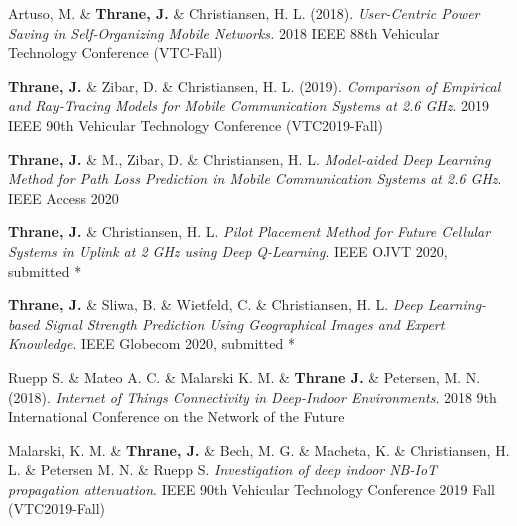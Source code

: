 \vspace{2em}


\noindent Artuso, M. \&  \textbf{Thrane, J.} \&  Christiansen, H. L. (2018). \textit{User-Centric Power Saving in Self-Organizing Mobile Networks.} 2018 IEEE 88th Vehicular Technology Conference (VTC-Fall) \cite{Artuso2018User-CentricNetworks}

\vspace{2em}

\noindent \textbf{Thrane, J.} \&  Zibar, D. \&  Christiansen, H. L. (2019). \textit{Comparison of Empirical and Ray-Tracing Models for Mobile Communication Systems at 2.6 GHz}. 2019 IEEE 90th Vehicular Technology Conference (VTC2019-Fall) \cite{Thrane2019ComparisonGHz}

\vspace{2em}

\noindent \textbf{Thrane, J.} \&  M., Zibar, D. \&  Christiansen, H. L. \textit{Model-aided Deep Learning Method for Path Loss Prediction in Mobile Communication Systems at 2.6 GHz}. IEEE Access 2020 \cite{Thrane020ModelAidedDeepLearning}

\vspace{2em}

\noindent \textbf{Thrane, J.} \&  Christiansen, H. L. \textit{Pilot Placement Method for Future Cellular Systems in Uplink at 2 GHz using Deep Q-Learning}. IEEE OJVT 2020, submitted \cite{Thrane2020PilotQ-Learning} *


\vspace{2em}

\noindent \textbf{Thrane, J.} \&  Sliwa, B. \& Wietfeld, C. \& Christiansen, H. L. \textit{Deep Learning-based Signal Strength Prediction Using Geographical Images and Expert Knowledge}. IEEE Globecom 2020, submitted \cite{Thrane2020DeepKnowledge} *

\vspace{2em}
\noindent 
Ruepp S. \& Mateo A. C.  \& Malarski K. M.  \& \textbf{Thrane J.}  \&  Petersen, M. N. (2018). \textit{Internet of Things Connectivity in Deep-Indoor Environments}. 2018 9th International Conference on the Network of the Future \cite{Malarski2018DemonstrationCases}

\vspace{2em}
\noindent Malarski, K. M. \& \textbf{Thrane, J.} \&  Bech, M. G. \&  Macheta, K. \&  Christiansen, H. L.  \& Petersen  M. N. \& Ruepp  S. \textit{Investigation of deep indoor NB-IoT propagation attenuation}. IEEE 90th Vehicular Technology Conference 2019 Fall (VTC2019-Fall) \cite{Malarski2019InvestigationAttenuation}

